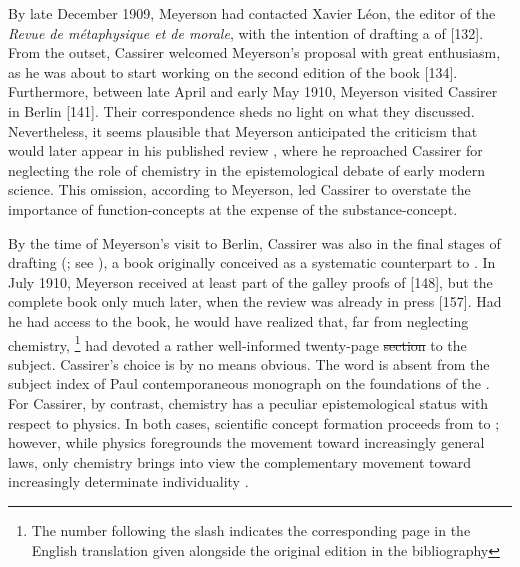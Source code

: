 \documentclass[submitted,12pt]{article}
\providecommand{\DIFadd}[1]{{\protect\color{blue}\uwave{#1}}} %
\providecommand{\DIFdel}[1]{{\protect\color{red}\sout{#1}}}                      %
\providecommand{\DIFaddbegin}{} %
\providecommand{\DIFaddend}{} %
\providecommand{\DIFdelbegin}{} %
\providecommand{\DIFdelend}{} %
\begin{document}
\DIFdelbegin %

\DIFdelend By late December 1909, Meyerson had contacted Xavier Léon, the editor of the \emph{Revue de métaphysique et de morale}, with the intention of drafting a  of \EPt {}[132]. From the outset, Cassirer welcomed Meyerson’s proposal with great enthusiasm, as he was about to start working on the second edition of the book \DIFdelbegin %
\DIFdelend \DIFaddbegin {}[134]\DIFaddend . Furthermore, between late April and early May 1910, Meyerson visited Cassirer in Berlin [141]. Their correspondence sheds no light on what they discussed. Nevertheless, it seems plausible that Meyerson anticipated the criticism that would later appear in his published review \citep{Meyerson1911}, where he reproached Cassirer for neglecting the role of chemistry in the epistemological debate of early modern science. This omission, according to Meyerson, led Cassirer to overstate the importance of function-concepts at the expense of the substance-concept.

By the time of Meyerson’s visit to Berlin, Cassirer was also in the final stages of drafting \SFt (\cite{Cassirer1910}; see \cite{Heis2014a}), a book originally conceived as a systematic counterpart to \EPt. In July 1910, Meyerson received at least part of the galley proofs of \SFt {}[148], but the complete book only much later, when the review was already in press [157]. Had he had access to the book, he would have realized that, far from neglecting chemistry, \citet[270--92/203--20]{Cassirer1910}\footnote{The number following the slash indicates the corresponding page in the English translation given alongside the original edition in the bibliography\DIFaddbegin \DIFadd{.}\DIFaddend } had devoted a rather well-informed twenty-page \DIFdelbegin \DIFdel{section }\DIFdelend \DIFaddbegin \DIFadd{discussion }\DIFaddend to the subject. Cassirer's choice is by no means obvious. The word  is absent from the subject index of Paul  contemporaneous  monograph on the foundations of the . For Cassirer, by contrast, chemistry has a peculiar epistemological status with respect to physics. In both cases, scientific concept formation proceeds from \SCs to \FCs; however, while physics foregrounds the movement toward increasingly general laws, only chemistry brings into view the complementary movement toward increasingly determinate individuality \citep[270--72/203--5; 289--93/217--21]{Cassirer1910}.
\end{document}
